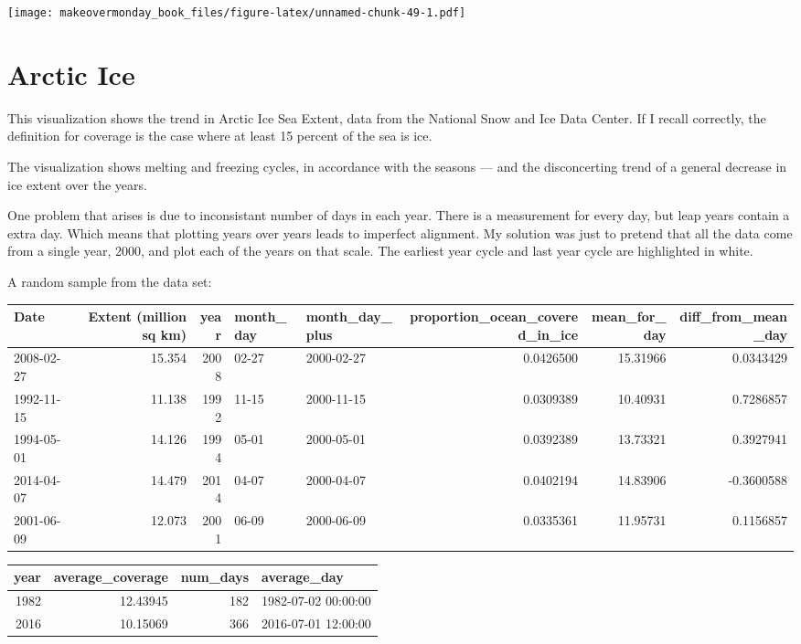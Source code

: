\documentclass[]{book}
\theoremstyle{definition}
\theoremstyle{definition}
\theoremstyle{definition}
\theoremstyle{remark}
\begin{document}
\texttt{[image: makeovermonday\_book\_files/figure-latex/unnamed-chunk-49-1.pdf]}

\chapter{Arctic Ice}\label{arctic-ice}

This visualization shows the trend in Arctic Ice Sea Extent, data from
the National Snow and Ice Data Center. If I recall correctly, the
definition for coverage is the case where at least 15 percent of the sea
is ice.

The visualization shows melting and freezing cycles, in accordance with
the seasons --- and the disconcerting trend of a general decrease in ice
extent over the years.

One problem that arises is due to inconsistant number of days in each
year. There is a measurement for every day, but leap years contain a
extra day. Which means that plotting years over years leads to imperfect
alignment. My solution was just to pretend that all the data come from a
single year, 2000, and plot each of the years on that scale. The
earliest year cycle and last year cycle are highlighted in white.

A random sample from the data set:

\begin{tabular}{l|r|r|l|l|r|r|r}
\hline
Date & Extent (million sq km) & year & month\_day & month\_day\_plus & proportion\_ocean\_covered\_in\_ice & mean\_for\_day & diff\_from\_mean\_day\\
\hline
2008-02-27 & 15.354 & 2008 & 02-27 & 2000-02-27 & 0.0426500 & 15.31966 & 0.0343429\\
\hline
1992-11-15 & 11.138 & 1992 & 11-15 & 2000-11-15 & 0.0309389 & 10.40931 & 0.7286857\\
\hline
1994-05-01 & 14.126 & 1994 & 05-01 & 2000-05-01 & 0.0392389 & 13.73321 & 0.3927941\\
\hline
2014-04-07 & 14.479 & 2014 & 04-07 & 2000-04-07 & 0.0402194 & 14.83906 & -0.3600588\\
\hline
2001-06-09 & 12.073 & 2001 & 06-09 & 2000-06-09 & 0.0335361 & 11.95731 & 0.1156857\\
\hline
\end{tabular}

\begin{tabular}{r|r|r|l}
\hline
year & average\_coverage & num\_days & average\_day\\
\hline
1982 & 12.43945 & 182 & 1982-07-02 00:00:00\\
\hline
2016 & 10.15069 & 366 & 2016-07-01 12:00:00\\
\hline
\end{tabular}
\end{document}
